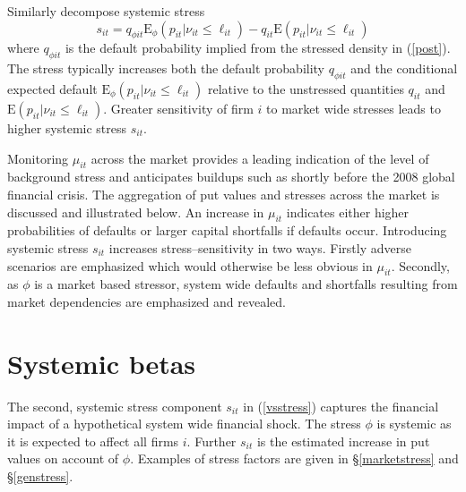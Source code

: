 \documentclass[12pt]{article}
\newcommand{\E}{\mathrm{E}}
\newcommand{\eref}[1]{(\ref{#1})}
\newcommand{\sref}[1]{\S\ref{#1}}
\newcommand{\be}[1]{\begin{equation}\label{#1}}
\newcommand{\ee}{\end{equation}}
\begin{document}
Similarly decompose systemic stress
$$
s_{it} = q_{\phi it}\E_\phi(p_{it}|\nu_{it}\le \ell_{it})-q_{it}\E(p_{it}|\nu_{it} \le \ell_{it})
$$
where $q_{\phi it}$ is the default probability implied from the stressed density in \eref{post}. The stress typically increases both the default probability  $q_{\phi it}$ and the conditional expected default $\E_\phi(p_{it}|\nu_{it}\le \ell_{it})$ relative to the unstressed quantities $q_{it}$ and $\E(p_{it}|\nu_{it} \le \ell_{it})$. Greater sensitivity of firm $i$ to market wide stresses leads to higher systemic stress $s_{it}$.

Monitoring $\mu_{it}$ across the market provides a leading indication of the level of background stress and anticipates buildups such as shortly before the 2008 global financial crisis. The aggregation of put values and stresses across the market is discussed and illustrated below. An increase in $\mu_{it}$ indicates either higher probabilities of defaults or larger capital shortfalls if defaults occur. Introducing systemic stress $s_{it}$ increases stress--sensitivity in two ways. Firstly adverse scenarios are emphasized which would otherwise be less obvious in $\mu_{it}$. Secondly, as $\phi$ is a market based stressor, system wide defaults and shortfalls resulting from market dependencies are emphasized and revealed.

\section{Systemic betas}

The second, systemic stress component $s_{it}$ in  \eref{vsstress}  captures the financial impact of a  hypothetical system wide financial shock.   The stress $\phi$ is systemic as it is expected to affect all firms $i$.  Further $s_{it}$ is the estimated   increase in put values on account of  $\phi$.   Examples of stress factors are given in \sref{marketstress} and \sref{genstress}.
\end{document}
